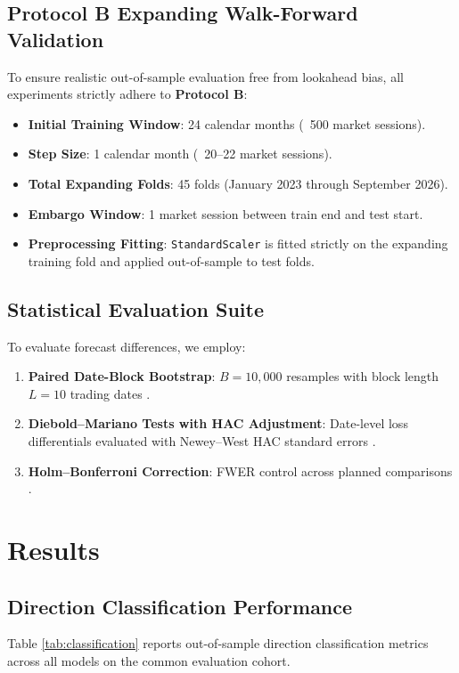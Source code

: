 \documentclass[10pt,journal,compsoc,twocolumn]{IEEEtran}
\begin{document}
\subsection{Protocol B Expanding Walk-Forward Validation}
To ensure realistic out-of-sample evaluation free from lookahead bias, all experiments strictly adhere to \textbf{Protocol B}:
\begin{itemize}
    \item \textbf{Initial Training Window}: 24 calendar months (~500 market sessions).
    \item \textbf{Step Size}: 1 calendar month (~20--22 market sessions).
    \item \textbf{Total Expanding Folds}: 45 folds (January 2023 through September 2026).
    \item \textbf{Embargo Window}: 1 market session between train end and test start.
    \item \textbf{Preprocessing Fitting}: \texttt{StandardScaler} is fitted strictly on the expanding training fold and applied out-of-sample to test folds.
\end{itemize}

\subsection{Statistical Evaluation Suite}
To evaluate forecast differences, we employ:
\begin{enumerate}
    \item \textbf{Paired Date-Block Bootstrap}: $B = 10,000$ resamples with block length $L = 10$ trading dates \cite{kunsch1989jackknife}.
    \item \textbf{Diebold--Mariano Tests with HAC Adjustment}: Date-level loss differentials evaluated with Newey--West HAC standard errors \cite{diebold1995comparing, newey1987simple, harvey1997testing}.
    \item \textbf{Holm--Bonferroni Correction}: FWER control across planned comparisons \cite{holm1979simple}.
\end{enumerate}

\section{Results}
\subsection{Direction Classification Performance}
Table \ref{tab:classification} reports out-of-sample direction classification metrics across all models on the common evaluation cohort.
\end{document}
